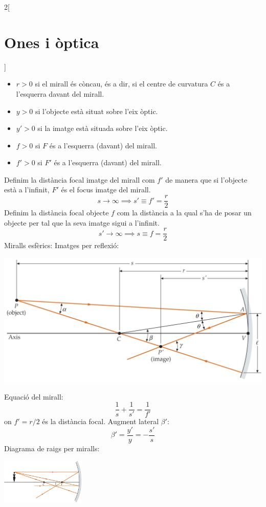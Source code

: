 \documentclass[class=article,10pt,crop=false]{standalone}
\begin{document}
\begin{multicols}{2}[\section{Ones i òptica}]
\begin{itemize}
    \item $r>0$ si el mirall és còncau, és a dir, si el centre de curvatura $C$ és a l'esquerra davant del mirall.
    \item $y>0$ si l'objecte està situat sobre l'eix òptic.
    \item $y'>0$ si la imatge està situada sobre l'eix òptic.
    \item $f>0$ si $F$ és a l'esquerra (davant) del mirall.
    \item $f'>0$ si $F'$ és a l'esquerra (davant) del mirall.
\end{itemize}
Definim la distància focal imatge del mirall com $f'$ de manera que si l'objecte està a l'infinit, $F'$ és el focus imatge del mirall. $$s\to\infty\implies s'\equiv f'=\frac{r}{2}$$ Definim la distància focal objecte $f$ com la distància a la qual s'ha de posar un objecte per tal que la seva imatge sigui a l'infinit. $$s'\to\infty\implies s\equiv f=\frac{r}{2}$$
Miralls esfèrics:\newline
Imatges per reflexió:\newline
\begin{minipage}{\linewidth}
    \centering
    \includegraphics[width=\linewidth]{Physics/1st/Waves_and_optics/Images/conc.jpg} 
\end{minipage}
Equació del mirall:
$$\frac{1}{s}+\frac{1}{s'}=\frac{1}{f'}$$ {\footnotesize on $f'=r/2$ és la distància focal.}\newline 
Augment lateral $\beta'$:
$$\beta'=\frac{y'}{y}=-\frac{s'}{s}$$
Diagrama de raigs per miralls:\newline
\begin{minipage}{\linewidth}
    \centering
    \includegraphics[width=4cm]{Physics/1st/Waves_and_optics/Images/raigs.jpg} 

\end{minipage}
\end{multicols}
\end{document}
